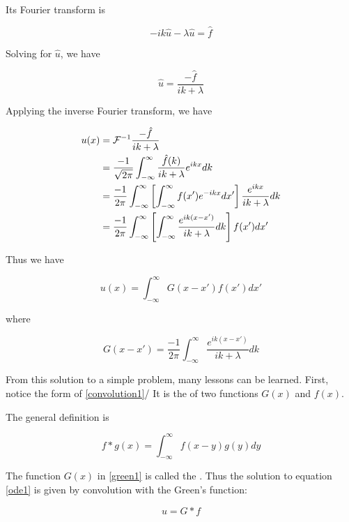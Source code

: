 Its Fourier transform is

\begin{equation}
-ik \hat u - \lambda \hat u = \hat f
\end{equation}

Solving for $\hat u$, we have

\begin{equation}
\hat u = \frac{-\hat f}{ik + \lambda}
\end{equation}

Applying the inverse Fourier transform, we have

\begin{align}
u(x) &= \mathcal{F}^{-1}\frac{-\hat f}{ik + \lambda} \\
 &= \frac{-1}{\sqrt{2\pi}} \int_{-\infty}^{\infty} \frac{ \hat f(k) }{ik + \lambda}e^{ikx} dk \\
 &= \frac{-1}{2\pi} \int_{-\infty}^{\infty} \left[  \int_{-\infty}^{\infty} f(x')e^{-ikx} dx' \right] \frac{e^{ikx}}{ik + \lambda}dk \\
&=  \frac{-1}{2\pi} \int_{-\infty}^{\infty} \left[  \int_{-\infty}^{\infty} \frac{e^{ik(x-x')}} {ik + \lambda} dk \right] f(x')dx'
\end{align}

Thus we have

\begin{equation}
\label{convolution1}
u(x) = \int_{-\infty}^{\infty} G(x-x') f(x') dx'
\end{equation}

where 

\begin{equation}
\label{green1}
G(x-x')  = \frac{-1}{2\pi} \int_{-\infty}^{\infty} \frac{e^{ik(x-x')}} {ik + \lambda}dk
\end{equation}

From this solution to a simple problem, many lessons can be learned.  First, notice the form of  \eqref{convolution1}/  It is the  of two functions $G(x)$ and $f(x)$.

The general definition is

\begin{equation}
f*g(x) = \int_{-\infty}^{\infty} f(x-y)g(y)dy
\end{equation}

The function $G(x)$ in \eqref{green1} is called the .  Thus the solution to equation \eqref{ode1} is given by convolution with the Green's function:

\begin{equation}
u = G*f
\end{equation}

